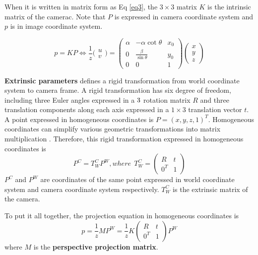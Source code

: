 When it is written in matrix form as Eq \ref{eq3}, the $3\times3$ matrix $K$ is the intrinsic matrix of the camerac. Note that $P$ is expressed in camera coordinate system and $p$ is in image coordinate system.

\begin{equation}
\label{eq3}
p = K P \Leftrightarrow \frac{1}{z}
\bigl(\begin{smallmatrix}
u\\  v 
\end{smallmatrix}\bigr) 
= 
\begin{pmatrix}
\alpha & -\alpha \cot\theta & x_0\\ 0 & \frac{\beta}{\sin\theta}  & y_0\\  0 &0  &1 
\end{pmatrix}
\begin{pmatrix} 
x\\  y\\  z
\end{pmatrix}
\end{equation}

\textbf{Extrinsic parameters} defines a rigid transformation from world coordinate system to camera frame. A rigid transformation has six degree of freedom, including three Euler angles expressed in a $3\time3$ rotation matrix $R$ and three translation components along each axis expressed in a $1\times3$ translation vector $t$. A point expressed in homogeneous coordinates is $P=(x, y, z, 1)^T$. Homogeneous coordinates can simplify various geometric transformations into matrix multiplication \cite{Forsyth:2002:CVM:580035}.  Therefore, this rigid transformation expressed in homogeneous coordinates is 
\begin{equation}
\label{eq4}
P^{C} = T_W^C P^W, where ~~T_W^C = 
\begin{pmatrix}
	R & t\\ 
	0^T& 1
\end{pmatrix}
\end{equation}
$P^{C}$ and $P^W$ are coordinates of the same point expressed in world coordinate system and camera coordinate system respectively. $T_W^C$ is the extrinsic matrix of the camera.

To put it all together, the projection equation in homogeneous coordinates is 
\begin{equation}
\label{eq5}
p = \frac{1}{z} M P^W = \frac{1}{z} K
\begin{pmatrix}
R & t\\ 
0^T& 1
\end{pmatrix} P^W
\end{equation}
where $M$ is the \textbf{perspective projection matrix}.